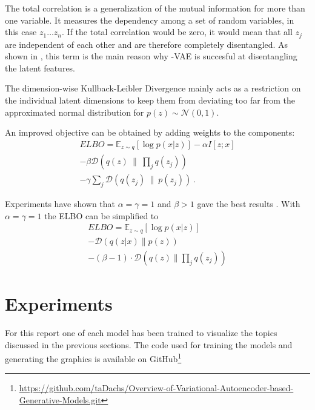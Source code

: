 \documentclass[a4paper]{IEEEtran}
\begin{document}
The total correlation is a generalization of the mutual information for more than one variable. It measures the dependency among a set of random variables, in this case $z_1 \ldots z_n$. If the total correlation would be zero, it would mean that all $z_j$ are independent of each other and are therefore completely disentangled. As shown in \cite{chen2019isolating}, this term is the main reason why \textbeta -VAE is succesful at disentangling the latent features.

The dimension-wise Kullback-Leibler Divergence mainly acts as a restriction on the individual latent dimensions to keep them from deviating too far from the approximated normal distribution for $p(z) \sim \mathcal{N}(0,1)$.

An improved objective can be obtained by adding weights to the components:
\begin{align*}
	ELBO = \mathbb{E}_{z \sim q}\left[ \log p(x|z) \right] - \alpha I[z;x] \\ - \beta \mathcal{D}(q(z) \ \| \  \prod_{j} q(z_j)) \\ - \gamma \sum_j \mathcal{D}(q(z_j) \ \| \ p(z_j))\,.
\end{align*}

Experiments have shown that $\alpha = \gamma = 1$ and $\beta > 1$ gave the best results \cite{chen2019isolating}. With $\alpha = \gamma = 1$ the ELBO can be simplified to
\begin{align*}
	ELBO = \mathbb{E}_{z \sim q}\left[ \log p(x|z) \right]\\
	 - \mathcal{D}(q(z|x) \| p(z))\\
	 - (\beta - 1) \cdot \mathcal{D}(q(z) \| \prod_j q(z_j))
\end{align*}

\section{Experiments}
\label{sec:experiments}


For this report one of each model has been trained to visualize the topics discussed in the previous sections. The code used for training the models and generating the graphics is available on GitHub\footnote{\url{https://github.com/taDachs/Overview-of-Variational-Autoencoder-based-Generative-Models.git}}
\end{document}
